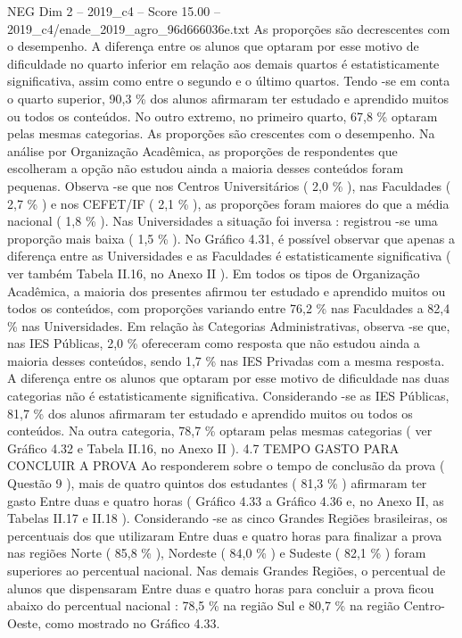 \begin{textsample}{NEG Dim 2 – 2019\_c4 – Score 15.00 – 2019\_c4/enade\_2019\_agro\_96d666036e.txt}
As proporções são decrescentes com o desempenho.
A diferença entre os alunos que optaram por esse motivo de dificuldade no quarto inferior em relação aos demais quartos é estatisticamente significativa, assim como entre o segundo e o último quartos.
Tendo -se em conta o quarto superior, 90,3 \% dos alunos afirmaram ter estudado e aprendido muitos ou todos os conteúdos.
No outro extremo, no primeiro quarto, 67,8 \% optaram pelas mesmas categorias.
As proporções são crescentes com o desempenho.
Na análise por Organização Acadêmica, as proporções de respondentes que escolheram a opção não estudou ainda a maioria desses conteúdos foram pequenas.
Observa -se que nos Centros Universitários ( 2,0 \% ), nas Faculdades ( 2,7 \% ) e nos CEFET/IF ( 2,1 \% ), as proporções foram maiores do que a média nacional ( 1,8 \% ).
Nas Universidades a situação foi inversa : registrou -se uma proporção mais baixa ( 1,5 \% ).
No Gráfico 4.31, é possível observar que apenas a diferença entre as Universidades e as Faculdades é estatisticamente significativa ( ver também Tabela II.16, no Anexo II ).
Em todos os tipos de Organização Acadêmica, a maioria dos presentes afirmou ter estudado e aprendido muitos ou todos os conteúdos, com proporções variando entre 76,2 \% nas Faculdades a 82,4 \% nas Universidades.
Em relação às Categorias Administrativas, observa -se que, nas IES Públicas, 2,0 \% ofereceram como resposta que não estudou ainda a maioria desses conteúdos, sendo 1,7 \% nas IES Privadas com a mesma resposta.
A diferença entre os alunos que optaram por esse motivo de dificuldade nas duas categorias não é estatisticamente significativa.
Considerando -se as IES Públicas, 81,7 \% dos alunos afirmaram ter estudado e aprendido muitos ou todos os conteúdos.
Na outra categoria, 78,7 \% optaram pelas mesmas categorias ( ver Gráfico 4.32 e Tabela II.16, no Anexo II ). 4.7 TEMPO GASTO PARA CONCLUIR A PROVA Ao responderem sobre o tempo de conclusão da prova ( Questão 9 ), mais de quatro quintos dos estudantes ( 81,3 \% ) afirmaram ter gasto Entre duas e quatro horas ( Gráfico 4.33 a Gráfico 4.36 e, no Anexo II, as Tabelas II.17 e II.18 ).
Considerando -se as cinco Grandes Regiões brasileiras, os percentuais dos que utilizaram Entre duas e quatro horas para finalizar a prova nas regiões Norte ( 85,8 \% ), Nordeste ( 84,0 \% ) e Sudeste ( 82,1 \% ) foram superiores ao percentual nacional.
Nas demais Grandes Regiões, o percentual de alunos que dispensaram Entre duas e quatro horas para concluir a prova ficou abaixo do percentual nacional : 78,5 \% na região Sul e 80,7 \% na região Centro-Oeste, como mostrado no Gráfico 4.33.

\end{textsample}
